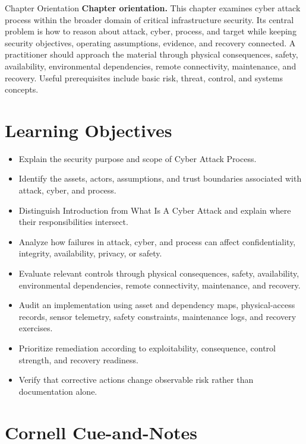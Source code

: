 \documentclass[11pt,letterpaper]{article}
\title{\CornellDocumentTitle}
\author{}
\date{}
\begin{document}
\maketitle
\begin{CornellOverviewBox}{Chapter Orientation}
\textbf{Chapter orientation.} This chapter examines cyber attack process within the broader domain of critical infrastructure security. Its central problem is how to reason about attack, cyber, process, and target while keeping security objectives, operating assumptions, evidence, and recovery connected. A practitioner should approach the material through physical consequences, safety, availability, environmental dependencies, remote connectivity, maintenance, and recovery. Useful prerequisites include basic risk, threat, control, and systems concepts.
\end{CornellOverviewBox}
\section*{Learning Objectives}
\begin{itemize}
\item Explain the security purpose and scope of Cyber Attack Process.
\item Identify the assets, actors, assumptions, and trust boundaries associated with attack, cyber, and process.
\item Distinguish Introduction from What Is A Cyber Attack and explain where their responsibilities intersect.
\item Analyze how failures in attack, cyber, and process can affect confidentiality, integrity, availability, privacy, or safety.
\item Evaluate relevant controls through physical consequences, safety, availability, environmental dependencies, remote connectivity, maintenance, and recovery.
\item Audit an implementation using asset and dependency maps, physical-access records, sensor telemetry, safety constraints, maintenance logs, and recovery exercises.
\item Prioritize remediation according to exploitability, consequence, control strength, and recovery readiness.
\item Verify that corrective actions change observable risk rather than documentation alone.
\end{itemize}
\section*{Cornell Cue-and-Notes}
\end{document}

